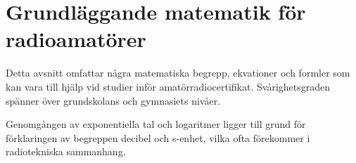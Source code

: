 \chapter{Grundläggande matematik för radioamatörer}

Detta avsnitt omfattar några matematiska begrepp, ekvationer och formler som kan
vara till hjälp vid studier inför amatörradiocertifikat. Svårighetsgraden
spänner över grundskolans och gymnasiets nivåer.

Genomgången av exponentiella tal och logaritmer ligger till grund för
förklaringen av begreppen decibel och s-enhet, vilka ofta förekommer i
radiotekniska sammanhang.


